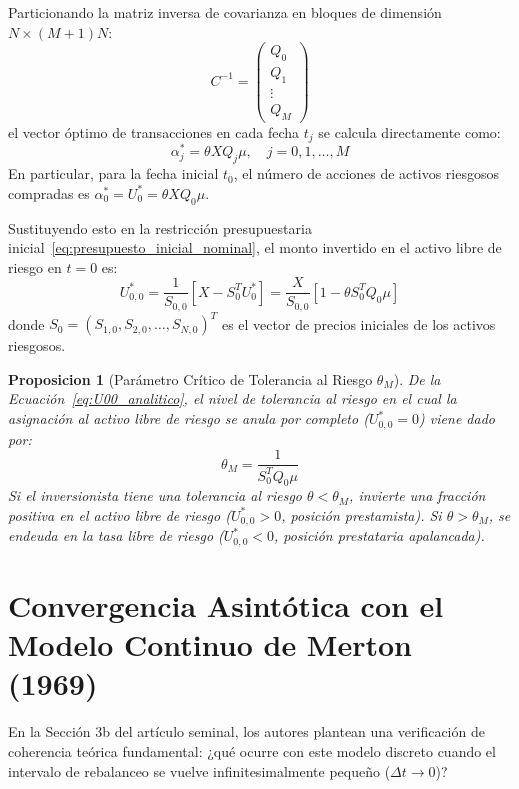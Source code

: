 \documentclass[11pt,a4paper]{report}
\newtheorem{proposition}[theorem]{Proposicion}
\numberwithin{equation}{chapter}
\begin{document}
Particionando la matriz inversa de covarianza en bloques de dimensión $N \times (M+1)N$:
\begin{equation}
    C^{-1} = \begin{pmatrix} Q_0 \\ Q_1 \\ \vdots \\ Q_M \end{pmatrix}
\end{equation}
el vector óptimo de transacciones en cada fecha $t_j$ se calcula directamente como:
\begin{equation}
    \alpha_j^* = \theta X Q_j \mu, \quad j = 0, 1, \dots, M
\end{equation}
En particular, para la fecha inicial $t_0$, el número de acciones de activos riesgosos compradas es $\alpha_0^* = U_0^* = \theta X Q_0 \mu$.

Sustituyendo esto en la restricción presupuestaria inicial~\eqref{eq:presupuesto_inicial_nominal}, el monto invertido en el activo libre de riesgo en $t=0$ es:
\begin{equation}
    U_{0,0}^* = \frac{1}{S_{0,0}} \left[ X - S_0^T U_0^* \right] = \frac{X}{S_{0,0}} \left[ 1 - \theta S_0^T Q_0 \mu \right] \label{eq:U00_analitico}
\end{equation}
donde $S_0 = (S_{1,0}, S_{2,0}, \dots, S_{N,0})^T$ es el vector de precios iniciales de los activos riesgosos.

\begin{proposition}[Parámetro Crítico de Tolerancia al Riesgo $\theta_M$]
De la Ecuación~\eqref{eq:U00_analitico}, el nivel de tolerancia al riesgo en el cual la asignación al activo libre de riesgo se anula por completo ($U_{0,0}^* = 0$) viene dado por:
\begin{equation}
    \boxed{\theta_M = \frac{1}{S_0^T Q_0 \mu}}
\end{equation}
Si el inversionista tiene una tolerancia al riesgo $\theta < \theta_M$, invierte una fracción positiva en el activo libre de riesgo ($U_{0,0}^* > 0$, posición prestamista). Si $\theta > \theta_M$, se endeuda en la tasa libre de riesgo ($U_{0,0}^* < 0$, posición prestataria apalancada).
\end{proposition}

\section{Convergencia Asintótica con el Modelo Continuo de Merton (1969)}

En la Sección 3b del artículo seminal, los autores plantean una verificación de coherencia teórica fundamental: ¿qué ocurre con este modelo discreto cuando el intervalo de rebalanceo se vuelve infinitesimalmente pequeño ($\Delta t \to 0$)?
\end{document}
